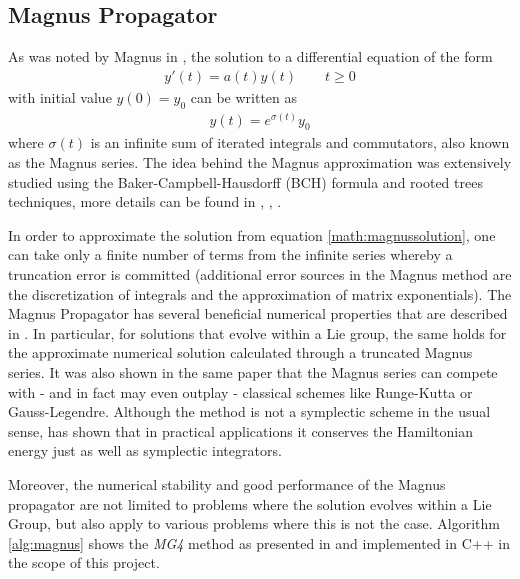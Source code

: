 \subsection{Magnus Propagator}
\label{sub:magnus_propagator}
%
As was noted by Magnus in \cite{Magnus1954}, the solution to a differential equation of the form 
%
\begin{align}
	y'(t) = a(t) y(t) \qquad t \ge 0
\end{align}
%
with initial value $y(0) = y_0$ can be written as
%
\begin{align}
	\label{math:magnussolution}
	y(t) = e^{\sigma (t)} y_0
\end{align}
%
where $\sigma (t)$ is an infinite sum of iterated integrals and commutators, also known as the Magnus series.
The idea behind the Magnus approximation was extensively studied using the Baker-Campbell-Hausdorff (BCH) formula and rooted trees techniques, more details can be found in \cite{Blanes2006}, \cite{Blanes2000}, \cite{Iserles1999}.
\par\medskip
%
In order to approximate the solution from equation \ref{math:magnussolution}, one can take only a finite number of terms from the infinite series whereby a truncation error is committed
(additional error sources in the Magnus method are the discretization of integrals and the approximation of matrix exponentials).
%
The Magnus Propagator has several beneficial numerical properties that are described in \cite{Iserles1999}.
In particular, for solutions that evolve within a Lie group, the same holds for the approximate numerical solution calculated through a truncated Magnus series. 
It was also shown in the same paper that the Magnus series can compete with - and in fact may even outplay - classical schemes like Runge-Kutta or Gauss-Legendre.
Although the method is not a symplectic scheme in the usual sense, \cite{Iserles1999} has shown that in practical applications it conserves the Hamiltonian energy just as well as symplectic integrators.
\par\medskip
Moreover, the numerical stability and good performance of the Magnus propagator are not limited to problems where the solution evolves within a Lie Group, but also apply to various problems where this is not the case.
Algorithm \ref{alg:magnus} shows the \emph{MG4} method as presented in \cite{Iserles1999} and implemented in C++ in the scope of this project.

